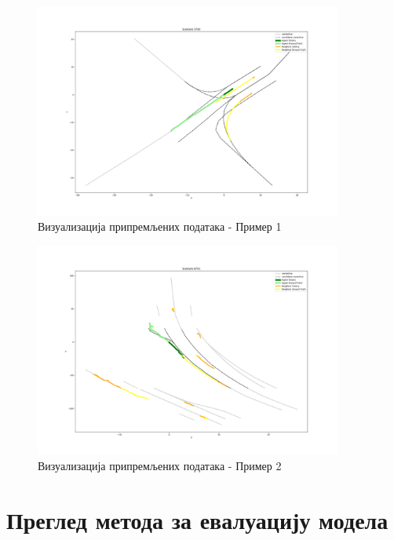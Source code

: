 \documentclass[11pt,oneside]{memoir}
\begin{document}
\begin{figure}[h!]
  \includegraphics[width=0.9\textwidth]{images/scenario3700.png}
  \caption{Визуализација припремљених података - Пример 1}
  \label{scenario-example-3700}
\end{figure}

\begin{figure}[h!]
  \includegraphics[width=0.9\textwidth]{images/scenario4791.png}
  \caption{Визуализација припремљених података - Пример 2}
  \label{scenario-example-4791}
\end{figure}


\chapter{Преглед метода за евалуацију модела}
\label{chp:razrada}
\end{document}
